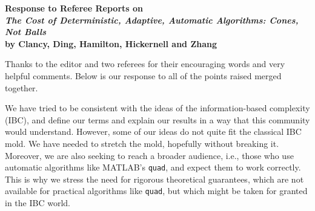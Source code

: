 \documentclass[11pt]{article}
\begin{document}
\begin{center}
{\bf Response to Referee Reports on \\[3ex]
{\Large \emph{The Cost of Deterministic, Adaptive, Automatic Algorithms:  Cones, Not Balls} \\[2ex] by Clancy, Ding, Hamilton, Hickernell and Zhang}}
\end{center}

\bigskip

Thanks to the editor and two referees for their encouraging words and very helpful comments.  Below is our response to all of the points raised merged together.  

We have tried to be consistent with the ideas of the information-based complexity (IBC), and define our terms and explain our results in a way that this community would understand.  However, some of our ideas do not quite fit the classical IBC mold.  We have needed to stretch the mold, hopefully without breaking it.  Moreover, we are also seeking to reach a broader audience, i.e., those who use automatic algorithms like MATLAB's {\tt quad}, and expect them to work correctly.  This is why we stress the need for rigorous theoretical guarantees, which are not available for practical algorithms like {\tt quad}, but which might be taken for granted in the IBC world.
\end{document}
